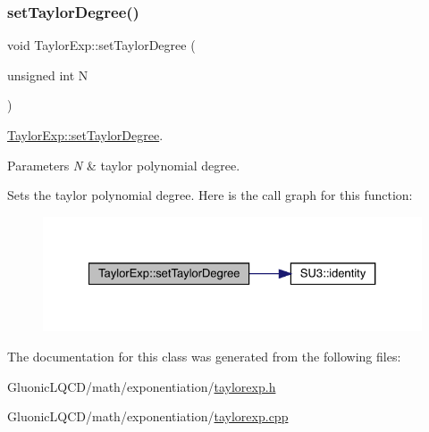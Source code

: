 \subsubsection{\texorpdfstring{setTaylorDegree()}{setTaylorDegree()}}
{\footnotesize\ttfamily void Taylor\+Exp\+::set\+Taylor\+Degree (\begin{DoxyParamCaption}\item[{unsigned int}]{N }\end{DoxyParamCaption})}



\mbox{\hyperlink{class_taylor_exp_a6a048363483f372300e412b27f218773}{Taylor\+Exp\+::set\+Taylor\+Degree}}. 


\begin{DoxyParams}{Parameters}
{\em N} & taylor polynomial degree.\\
\hline
\end{DoxyParams}
Sets the taylor polynomial degree. Here is the call graph for this function\+:
\nopagebreak
\begin{figure}[H]
\begin{center}
\leavevmode
\includegraphics[width=327pt]{class_taylor_exp_a6a048363483f372300e412b27f218773_cgraph}
\end{center}
\end{figure}


The documentation for this class was generated from the following files\+:\begin{DoxyCompactItemize}
\item 
Gluonic\+L\+Q\+C\+D/math/exponentiation/\mbox{\hyperlink{taylorexp_8h}{taylorexp.\+h}}\item 
Gluonic\+L\+Q\+C\+D/math/exponentiation/\mbox{\hyperlink{taylorexp_8cpp}{taylorexp.\+cpp}}\end{DoxyCompactItemize}
